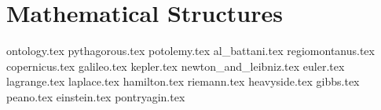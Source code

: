   \part{Mathematical Structures}

  {ontology.tex}
  {pythagorous.tex}
  {potolemy.tex}
  {al_battani.tex}
  {regiomontanus.tex}
  {copernicus.tex}
  {galileo.tex}
  {kepler.tex}
  {newton_and_leibniz.tex}
  {euler.tex}
  {lagrange.tex}
  {laplace.tex}
  {hamilton.tex}
  {riemann.tex}
  {heavyside.tex}
  {gibbs.tex}
  {peano.tex}
  {einstein.tex}
  {pontryagin.tex}
